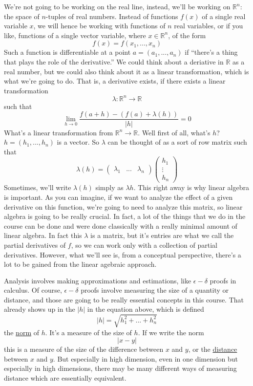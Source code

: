 \documentclass{article}
\newcommand{\reals}[0]{\mathbb{R}}
\begin{document}
We're not going to be working on the real line, instead, we'll be working on \(\reals^n\): the space of \(n\)-tuples of real numbers. Instead of functions \(f(x)\) of a single real variable \(x\), we will hence be working with functions of \(n\) real variables, or if you like, functions of a single vector variable, where \(x \in \reals^n\), of the form
\[f(x) = f(x_1,...,x_n)\]
Such a function is differentiable at a point \(a = (a_1,...,a_n)\) if ``there's a thing that plays the role of the derivative.'' We could think about a deriative in \(\reals\) as a real number, but we could also think about it as a linear transformation, which is what we're going to do. That is, a derivative exists, if there exists a linear transformation
\[\lambda: \reals^n \to \reals\]
such that
\[\lim_{h \to 0}\frac{f(a + h) - (f(a) + \lambda(h))}{|h|} = 0\]
What's a linear transformation from \(\reals^n \to \reals\). Well first of all, what's \(h\)? \(h = (h_1,...,h_n)\) is a vector. So \(\lambda\) can be thought of as a sort of row matrix such that
\[\lambda(h) = \begin{pmatrix}\lambda_1 & ... & \lambda_n\end{pmatrix}\begin{pmatrix} h_1 \\ \vdots \\ h_n\end{pmatrix}\]
Sometimes, we'll write \(\lambda(h)\) simply as \(\lambda h\). This right away is why linear algebra is important. As you can imagine, if we want to analyze the effect of a given derivative on this function, we're going to need to analyze this matrix, so linear algebra is going to be really crucial. In fact, a lot of the things that we do in the course can be done and were done classically with a really minimal amount of linear algebra. In fact this \(\lambda\) is a matrix, but it's entries are what we call the partial derivatives of \(f\), so we can work only with a collection of partial derivatives. However, what we'll see is, from a conceptual perspective, there's a lot to be gained from the linear agebraic approach.

Analysis involves making approximations and estimations, like \(\epsilon-\delta\) proofs in calculus. Of course, \(\epsilon-\delta\) proofs involve measuring the size of a quantity or distance, and those are going to be really essential concepts in this course. That already shows up in the \(|h|\) in the equation above, which is defined
\[|h| = \sqrt{h_1^2 + ... + h_n^2}\]
the \underline{norm} of \(h\). It's a measure of the size of \(h\). If we write the norm
\[|x - y|\]
this is a measure of the size of the difference between \(x\) and \(y\), or the \underline{distance} between \(x\) and \(y\). But especially in high dimension, even in one dimension but especially in high dimensions, there may be many different ways of measuring distance which are essentially equivalent.
\end{document}
